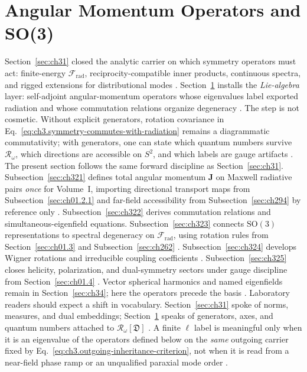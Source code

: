 \section{Angular Momentum Operators and SO(3)}
\label{sec:ch32}
Section~\ref{sec:ch31} closed the analytic carrier on which symmetry operators must act: finite-energy
\(\mathcal{F}_{\mathrm{rad}}\), reciprocity-compatible inner products, continuous spectra, and rigged
extensions for distributional modes \cite{kato1995}. Section~\ref{sec:ch32} installs
the \emph{Lie-algebra} layer: self-adjoint angular-momentum operators whose eigenvalues label exported
radiation and whose commutation relations organize degeneracy \cite{jackson1999}. The step is
not cosmetic. Without explicit generators, rotation covariance in
Eq.~\eqref{eq:ch3.symmetry-commutes-with-radiation} remains a diagrammatic commutativity; with generators,
one can state which quantum numbers survive \(\mathcal{R}_\omega\), which directions are accessible on
\(S^{2}\), and which labels are gauge artifacts \cite{stratton1941}.
The present section follows the same forward discipline as Section~\ref{sec:ch31}. Subsection~\ref{sec:ch321}
defines total angular momentum \(\mathbf{J}\) on Maxwell radiative pairs \emph{once} for Volume~I,
importing directional transport maps from Subsection~\ref{sec:ch01.2.1} and far-field accessibility from
Subsection~\ref{sec:ch294} by reference only \cite{stratton1941}. Subsection~\ref{sec:ch322}
derives commutation relations and simultaneous-eigenfield equations. Subsection~\ref{sec:ch323} connects
\(\mathrm{SO}(3)\) representations to spectral degeneracy on \(\mathcal{F}_{\mathrm{rad}}\), using rotation
rules from Section~\ref{sec:ch01.3} and Subsection~\ref{sec:ch262} \cite{jackson1999}. Subsection~\ref{sec:ch324}
develops Wigner rotations and irreducible coupling coefficients \cite{jackson1999}. Subsection~\ref{sec:ch325}
closes helicity, polarization, and dual-symmetry sectors under gauge discipline from
Section~\ref{sec:ch01.4} \cite{belinfante1940}. Vector spherical harmonics and named eigenfields remain in
Section~\ref{sec:ch34}; here the operators precede the basis \cite{hansen1988}.
Laboratory readers should expect a shift in vocabulary. Section~\ref{sec:ch31} spoke of norms, measures, and
dual embeddings; Section~\ref{sec:ch32} speaks of generators, axes, and quantum numbers attached to
\(\mathcal{R}_\omega[\mathfrak{D}]\) \cite{stratton1941}. A finite \(\ell\) label is
meaningful only when it is an eigenvalue of the operators defined below on the \emph{same} outgoing carrier
fixed by Eq.~\eqref{eq:ch3.outgoing-inheritance-criterion}, not when it is read from a near-field phase ramp
or an unqualified paraxial mode order \cite{allen1992}.
